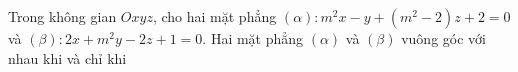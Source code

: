 \begin{ex}
Trong không gian $Oxyz$, cho hai mặt phẳng $(\alpha)\colon m^2x-y+(m^2-2)z+2=0$ và $(\beta)\colon 2x+m^2y-2z+1=0$. Hai mặt phẳng $(\alpha)$ và $(\beta)$ vuông góc với nhau khi và chỉ khi
\end{ex}
